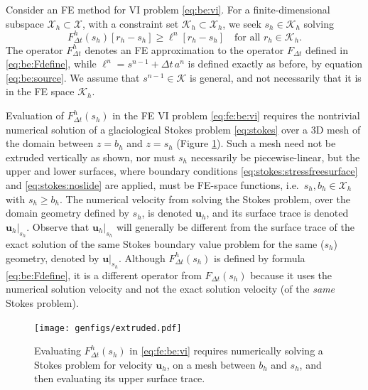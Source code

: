 \documentclass[hidelinks,onefignum,onetabnum,final]{siamart220329}  %
\newcommand{\bu}{\mathbf{u}}
\newcommand{\cK}{\mathcal{K}}
\newcommand{\cX}{\mathcal{X}}
\begin{document}
Consider an FE method for VI problem \eqref{eq:be:vi}.  For a finite-dimensional subspace $\cX_h\subset \cX$, with a constraint set $\cK_h\subset \cX_h$, we seek $s_h\in\cK_h$ solving
\begin{equation}
F^h_{\Delta t}(s_h)[r_h-s_h] \ge \ell^n[r_h-s_h] \quad \text{for all } r_h \in \cK_h. \label{eq:fe:be:vi}
\end{equation}
The operator $F^h_{\Delta t}$ denotes an FE approximation to the operator $F_{\Delta t}$ defined in \eqref{eq:be:Fdefine}, while $\ell^n = s^{n-1} + \Delta t\,a^n$ is defined exactly as before, by equation \eqref{eq:be:source}.  We assume that $s^{n-1} \in \cK$ is general, and not necessarily that it is in the FE space $\cK_h$.

Evaluation of $F^h_{\Delta t}(s_h)$ in the FE VI problem \eqref{eq:fe:be:vi} requires the nontrivial numerical solution of a glaciological Stokes problem \eqref{eq:stokes} over a 3D mesh of the domain between $z=b_h$ and $z=s_h$ (Figure \ref{fig:fe:operatorvisualization}).  Such a mesh need not be extruded vertically as shown, nor must $s_h$ necessarily be piecewise-linear, but the upper and lower surfaces, where boundary conditions \eqref{eq:stokes:stressfreesurface} and \eqref{eq:stokes:noslide} are applied, must be FE-space functions, i.e.~$s_h,b_h\in\cX_h$ with $s_h\ge b_h$.  The numerical velocity from solving the Stokes problem, over the domain geometry defined by $s_h$, is denoted $\bu_h$, and its surface trace is denoted $\bu_h|_{s_h}$.  Observe that $\bu_h|_{s_h}$ will generally be different from the surface trace of the exact solution of the same Stokes boundary value problem for the same ($s_h$) geometry, denoted by $\bu|_{s_h}$.  Although $F^h_{\Delta t}(s_h)$ is defined by formula \eqref{eq:be:Fdefine}, it is a different operator from $F_{\Delta t}(s_h)$ because it uses the numerical solution velocity and not the exact solution velocity (of the \emph{same} Stokes problem).

\begin{figure}[ht]
\begin{center}
\texttt{[image: genfigs/extruded.pdf]}
\end{center}
\caption{Evaluating $F^h_{\Delta t}(s_h)$ in \eqref{eq:fe:be:vi} requires numerically solving a Stokes problem for velocity $\bu_h$, on a mesh between $b_h$ and $s_h$, and then evaluating its upper surface trace.}
\label{fig:fe:operatorvisualization}
\end{figure}
\end{document}
